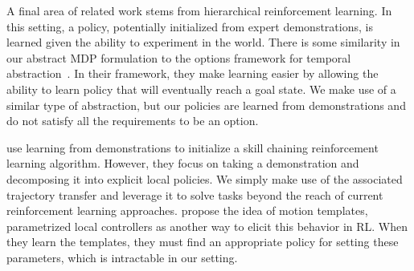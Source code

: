 A final area of related work stems from hierarchical reinforcement learning. 
In this setting, a policy, potentially initialized from expert demonstrations, is learned given the ability to experiment in the world.
There is some similarity in our abstract MDP formulation to the options framework for temporal abstraction~\cite{sutton1999between}.
In their framework, they make learning easier by allowing the ability to learn policy that will eventually reach a goal state.
We make use of a similar type of abstraction, but our policies are learned from demonstrations and do not satisfy all the requirements to be an option.

\citet{konidaris2010constructing} use learning from demonstrations to initialize a skill chaining reinforcement learning algorithm.
However, they focus on taking a demonstration and decomposing it into explicit local policies.
We simply make use of the associated trajectory transfer and leverage it to solve tasks beyond the reach of current reinforcement learning approaches.
\citet{Neumann09learningcomplex} propose the idea of motion templates, parametrized local controllers as another way to elicit this behavior in RL.
When they learn the templates, they must find an appropriate policy for setting these parameters, which is intractable in our setting.
